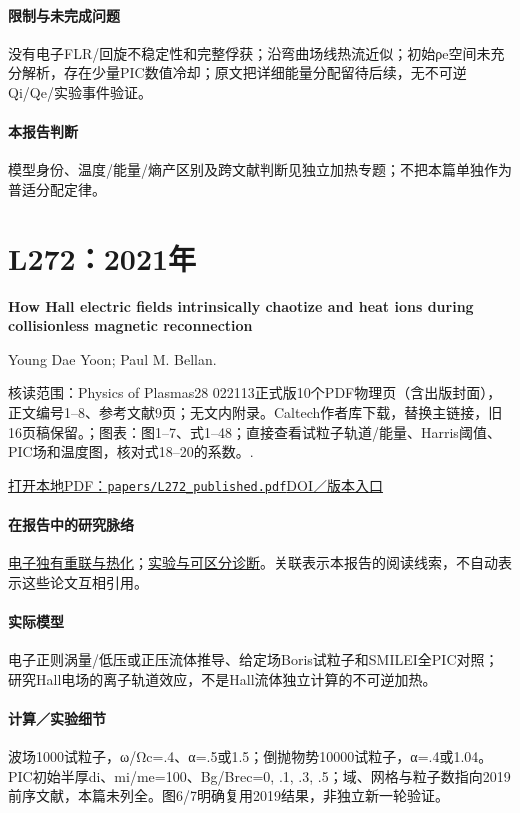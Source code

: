 \documentclass[UTF8,a4paper,11pt,openany,fontset=fandol]{ctexbook}
\begin{document}
\paragraph{限制与未完成问题}没有电子FLR/回旋不稳定性和完整俘获；沿弯曲场线热流近似；初始ρe空间未充分解析，存在少量PIC数值冷却；原文把详细能量分配留待后续，无不可逆Qi/Qe/实验事件验证。

\paragraph{本报告判断}模型身份、温度/能量/熵产区别及跨文献判断见独立加热专题；不把本篇单独作为普适分配定律。

\section{L272：2021年}\label{paper:L272}

\textbf{How Hall electric fields intrinsically chaotize and heat ions during collisionless magnetic reconnection}\citep{L272}\

Young Dae Yoon;  Paul M. Bellan.

\textsf{核读范围：}Physics of Plasmas28 022113正式版10个PDF物理页（含出版封面），正文编号1–8、参考文献9页；无文内附录。Caltech作者库下载，替换主链接，旧16页稿保留。；\textsf{图表：}图1–7、式1–48；直接查看试粒子轨道/能量、Harris阈值、PIC场和温度图，核对式18–20的系数。.

\href{run:../papers/L272_published.pdf}{打开本地PDF：\texttt{papers/L272\_published.pdf}}\quad\href{https://doi.org/10.1063/5.0040374}{DOI／版本入口}

\paragraph{在报告中的研究脉络}\hyperref[story:energy]{电子独有重联与热化}；\hyperref[story:diagnostic]{实验与可区分诊断}。关联表示本报告的阅读线索，不自动表示这些论文互相引用。

\paragraph{实际模型}电子正则涡量/低压或正压流体推导、给定场Boris试粒子和SMILEI全PIC对照；研究Hall电场的离子轨道效应，不是Hall流体独立计算的不可逆加热。

\paragraph{计算／实验细节}波场1000试粒子，ω/Ωc=.4、α=.5或1.5；倒抛物势10000试粒子，α=.4或1.04。PIC初始半厚di、mi/me=100、Bg/Brec=0, .1, .3, .5；域、网格与粒子数指向2019前序文献，本篇未列全。图6/7明确复用2019结果，非独立新一轮验证。
\end{document}
